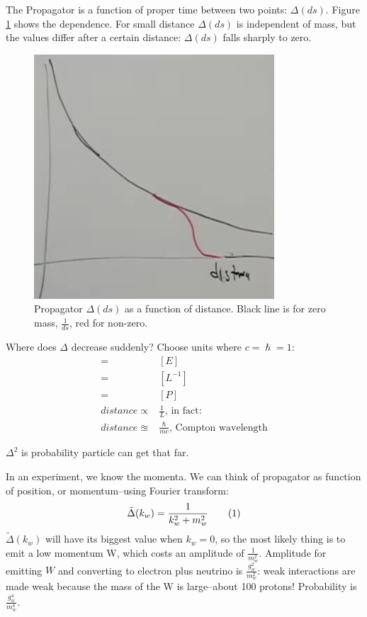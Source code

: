 \documentclass[]{article}
\newcommand\numberthis{\addtocounter{equation}{1}\tag{\theequation}}
\begin{document}
The Propagator is a function of proper time between two points: $\Delta(ds)$. Figure \ref{fig:2-6-propagator} shows the dependence. For small distance $\Delta(ds)$ is independent of mass, but the values differ  after a certain distance: $\Delta(ds)$ falls sharply to zero.

\begin{figure}[H]
	\caption[Propagator $\Delta(ds)$ as a function of distance.]{Propagator $\Delta(ds)$ as a function of distance. Black line is for zero mass, $\frac{1}{ds}$, red for non-zero.}\label{fig:2-6-propagator}
	\includegraphics[width=0.8\textwidth]{2-6-propagator}
\end{figure}

Where does $\Delta$ decrease suddenly? Choose units where $c=\hslash=1$:
\begin{align*}
	[m] =& [E]\\
	=& [L^{-1}]\\
	=& [P]\\
	distance \propto & \frac{1}{L} \text{, in fact:}\\
	distance \approxeq & \frac{\hslash}{mc} \text {, Compton wavelength}
\end{align*}

$\Delta^2$ is probability particle can get that far.

In an experiment, we know the momenta. We can think of propagator as function of position, or momentum--using Fourier transform:
\begin{align*}
\tilde{\Delta}(k_w)=\frac{1}{k_w^2+m_w^2} \numberthis \label{eq:Delta}
\end{align*}
 $\tilde{\Delta}(k_w)$ will have its biggest value when $k_w=0$, so the most likely thing is to emit a low momentum W, which costs an amplitude of $\frac{1}{m_w^2}$. Amplitude for emitting $W$ and converting to electron plus neutrino is $\frac{g_w^2}{m_w^2}$: weak interactions are made weak because the mass of the W is large--about 100 protons! Probability is $\frac{g_w^4}{m_w^4}$.
 
\end{document}
